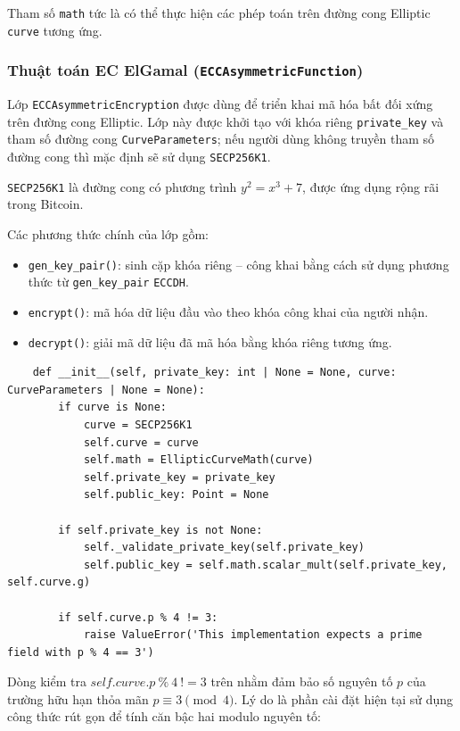 Tham số \texttt{math} tức là có thể thực hiện các phép toán trên đường cong Elliptic \texttt{curve} tương ứng.

\subsubsection{Thuật toán EC ElGamal (\texttt{ECCAsymmetricFunction})}

Lớp \texttt{ECCAsymmetricEncryption} được dùng để triển khai mã hóa bất đối xứng trên đường cong Elliptic. Lớp này được khởi tạo với khóa riêng \texttt{private\_key} và tham số đường cong \texttt{CurveParameters}; nếu người dùng không truyền tham số đường cong thì mặc định sẽ sử dụng \texttt{SECP256K1}.

\texttt{SECP256K1} là đường cong có phương trình $y^2 = x^3 + 7$, được ứng dụng rộng rãi trong Bitcoin.

Các phương thức chính của lớp gồm:
\begin{itemize}
	\item \texttt{gen\_key\_pair()}: sinh cặp khóa riêng -- công khai bằng cách sử dụng phương thức từ \texttt{gen\_key\_pair} \texttt{ECCDH}.
	\item \texttt{encrypt()}: mã hóa dữ liệu đầu vào theo khóa công khai của người nhận.
	\item \texttt{decrypt()}: giải mã dữ liệu đã mã hóa bằng khóa riêng tương ứng.
\end{itemize}

\begin{lstlisting}
	def __init__(self, private_key: int | None = None, curve: CurveParameters | None = None):
		if curve is None:
			curve = SECP256K1
			self.curve = curve
			self.math = EllipticCurveMath(curve)
			self.private_key = private_key
			self.public_key: Point = None

		if self.private_key is not None:
			self._validate_private_key(self.private_key)
			self.public_key = self.math.scalar_mult(self.private_key, self.curve.g)

		if self.curve.p % 4 != 3:
			raise ValueError('This implementation expects a prime field with p % 4 == 3')

\end{lstlisting}

Dòng kiểm tra \texttt{$self.curve.p ~\%~ 4~ != 3$} trên nhằm đảm bảo số nguyên tố $p$ của trường hữu hạn thỏa mãn $p \equiv 3 \pmod 4$. Lý do là phần cài đặt hiện tại sử dụng công thức rút gọn để tính căn bậc hai modulo nguyên tố:

